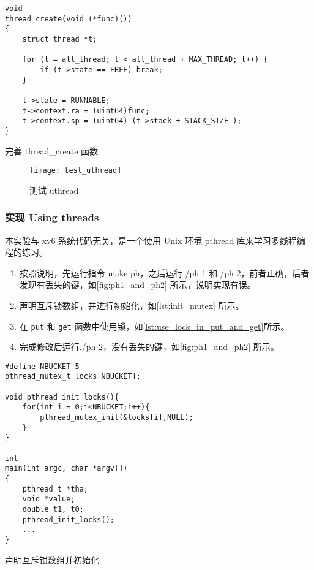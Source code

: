 \begin{listing}[!htb]
	\begin{verbatim}
void 
thread_create(void (*func)())
{
    struct thread *t;
    
    for (t = all_thread; t < all_thread + MAX_THREAD; t++) {
        if (t->state == FREE) break;
    }
    
    t->state = RUNNABLE;
    t->context.ra = (uint64)func;
    t->context.sp = (uint64) (t->stack + STACK_SIZE );
}
	\end{verbatim}
	\caption{完善 thread\_create 函数}\label{lst:modify_thread_create}
\end{listing}

\begin{figure}[!htb]
	\centering
	\texttt{[image: test\_uthread]}
	\caption{测试 uthread}
	\label{fig:test_uthread}
\end{figure}

\subsubsection{实现 Using threads}

本实验与 xv6 系统代码无关，是一个使用 Unix 环境 pthread 库来学习多线程编程的练习。

\begin{enumerate}
	\item 按照说明，先运行指令 make ph，之后运行./ph 1 和./ph 2，前者正确，后者发现有丢失的键，如\cref{fig:ph1_and_ph2} 所示，说明实现有误。
	\item 声明互斥锁数组，并进行初始化，如\cref{lst:init_mutex} 所示。
	\item 在 \texttt{put} 和 \texttt{get} 函数中使用锁，如\cref{lst:use_lock_in_put_and_get}所示。
	\item 完成修改后运行./ph 2，没有丢失的键，如\cref{fig:ph1_and_ph2} 所示。
\end{enumerate}

\begin{listing}[!htb]
	\begin{verbatim}
#define NBUCKET 5
pthread_mutex_t locks[NBUCKET];

void pthread_init_locks(){
    for(int i = 0;i<NBUCKET;i++){
        pthread_mutex_init(&locks[i],NULL);
    }
}

int
main(int argc, char *argv[])
{
    pthread_t *tha;
    void *value;
    double t1, t0;
    pthread_init_locks();
    ...
}
	\end{verbatim}
	\caption{声明互斥锁数组并初始化}\label{lst:init_mutex}
\end{listing}

